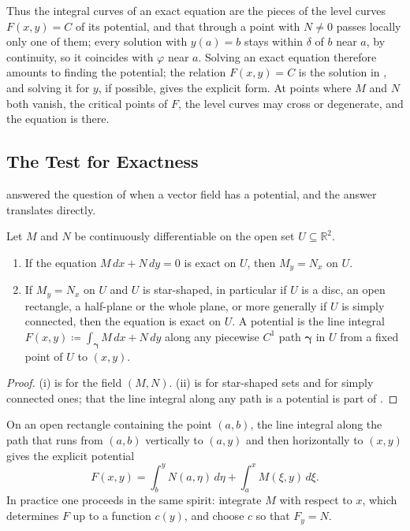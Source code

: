 Thus the integral curves of an exact equation are the pieces of the level curves $F(x,y)=C$ of its potential, and that through a point with $N\ne0$ passes locally only one of them; every solution with $y(a)=b$ stays within $\delta$ of $b$ near $a$, by continuity, so it coincides with $\varphi$ near $a$. Solving an exact equation therefore amounts to finding the potential; the relation $F(x,y)=C$ is the solution in , and solving it for $y$, if possible, gives the explicit form. At points where $M$ and $N$ both vanish, the critical points of $F$, the level curves may cross or degenerate, and the equation is  there.

\subsection{The Test for Exactness}

 answered the question of when a vector field has a potential, and the answer translates directly.

\begin{theorem}
\label{thm:exact-test}
Let $M$ and $N$ be continuously differentiable on the open set $U\subseteq\mathbb R^2$.
\begin{enumerate}
\item If the equation $M\,dx+N\,dy=0$ is exact on $U$, then $M_y=N_x$ on $U$.
\item If $M_y=N_x$ on $U$ and $U$ is star-shaped, in particular if $U$ is a disc, an open rectangle, a half-plane or the whole plane, or more generally if $U$ is simply connected, then the equation is exact on $U$. A potential is the line integral $F(x,y)\coloneqq\int_{\boldsymbol\gamma}M\,dx+N\,dy$ along any piecewise $C^1$ path $\boldsymbol\gamma$ in $U$ from a fixed point of $U$ to $(x,y)$.
\end{enumerate}
\end{theorem}

\begin{proof}
(i) is  for the field $(M,N)$. (ii) is  for star-shaped sets and  for simply connected ones; that the line integral along any path is a potential is part of .
\end{proof}

On an open rectangle containing the point $(a,b)$, the line integral along the path that runs from $(a,b)$ vertically to $(a,y)$ and then horizontally to $(x,y)$ gives the explicit potential
\begin{equation}
F(x,y)=\int_b^yN(a,\eta)\,d\eta+\int_a^xM(\xi,y)\,d\xi .
\label{eq:rectangle-potential}
\end{equation}
In practice one proceeds in the same spirit: integrate $M$ with respect to $x$, which determines $F$ up to a function $c(y)$, and choose $c$ so that $F_y=N$.

